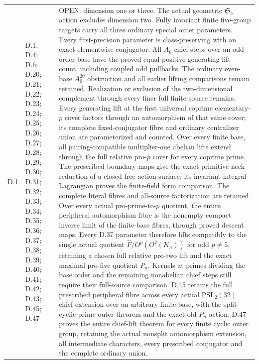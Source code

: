 \begin{longtable}{@{}p{1.1cm}p{3.0cm}p{10.3cm}@{}}
D.1 & D.1; D.4; D.6; D.20; D.21; D.22; D.23; D.24; D.25; D.26; D.27; D.28; D.29; D.30; D.31; D.32; D.33; D.34; D.35; D.36; D.37; D.38; D.39; D.40; D.41; D.42; D.43; D.45; D.47 & OPEN: dimension one or three. The actual geometric $\mathfrak S_3$ action excludes dimension two. Fully invariant finite five-group targets carry all three ordinary special outer parameters. Every first-precision parameter is class-preserving with an exact elementwise conjugator. All $A_6$ chief steps over an odd-order base have the proved equal positive generating-lift count, including coupled odd pullbacks. The ordinary even-base $A_6^{20}$ obstruction and all earlier lifting comparisons remain retained. Realization or exclusion of the two-dimensional complement through every finer full finite source remains. Every generating lift at the first universal coprime elementary-$p$ cover factors through an automorphism of that same cover; its complete fixed-conjugator fibre and ordinary centralizer union are parameterized and counted. Over every finite base, all pairing-compatible multiplier-one abelian lifts extend through the full relative pro-$p$ cover for every coprime prime. The prescribed boundary maps give the exact primitive neck reduction of a closed free-action surface; its invariant integral Lagrangian proves the finite-field form comparison. The complete literal fibres and all-source factorization are retained. Over every actual pro-prime-to-$p$ quotient, the entire peripheral automorphism fibre is the nonempty compact inverse limit of the finite-base fibres, through proved descent maps. Every D.37 parameter therefore lifts compatibly to the single actual quotient $\widehat F/O^p(O^2(K_n))$ for odd $p\ne5$, retaining a chosen full relative pro-two lift and the exact maximal pro-five quotient $P_n$. Kernels at primes dividing the base order and the remaining nonabelian chief steps still require their full-source comparison. D.45 retains the full prescribed peripheral fibre across every actual $\mathrm{PSL}_2(32)$ chief extension over an arbitrary finite base, with the split cyclic-prime outer theorem and the exact old $P_n$ action. D.47 proves the entire chief-lift theorem for every finite cyclic outer group, retaining the actual nonsplit automorphism extension, all intermediate characters, every prescribed conjugator and the complete ordinary union. \\

\end{longtable}
